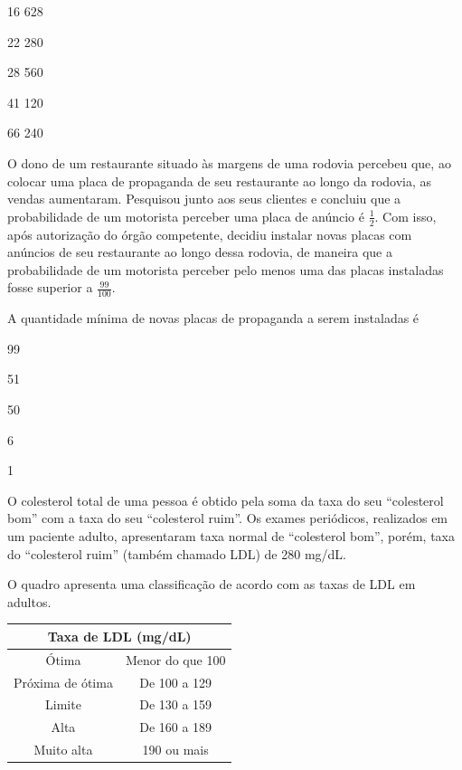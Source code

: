 \begin{alternativas}
\item 16 628
\item 22 280
\item 28 560
\item 41 120
\item 66 240
\end{alternativas}

\questao
O dono de um restaurante situado às margens de
uma rodovia percebeu que, ao colocar uma placa de
propaganda de seu restaurante ao longo da rodovia, as
vendas aumentaram. Pesquisou junto aos seus clientes
e concluiu que a probabilidade de um motorista perceber
uma placa de anúncio é $\displaystyle \frac{1}{2}$.
Com isso, após autorização
do órgão competente, decidiu instalar novas placas com
anúncios de seu restaurante ao longo dessa rodovia, de
maneira que a probabilidade de um motorista perceber
pelo menos uma das placas instaladas fosse superior
a $\displaystyle \frac{99}{100}$.

A quantidade mínima de novas placas de propaganda a
serem instaladas é

\begin{alternativas}
\item 99
\item 51
\item 50
\item 6
\item 1
\end{alternativas}

\questao
O colesterol total de uma pessoa é obtido pela
soma da taxa do seu “colesterol bom” com a taxa do
seu “colesterol ruim”. Os exames periódicos, realizados
em um paciente adulto, apresentaram taxa normal
de “colesterol bom”, porém, taxa do “colesterol ruim”
(também chamado LDL) de 280 mg/dL.

O quadro apresenta uma classificação de acordo com
as taxas de LDL em adultos.

\begin{center}
\begin{tabular}{|c|c|}
\hline
\multicolumn{2}{|c|}{\textbf{Taxa de LDL (mg/dL)}} \\
\hline
Ótima & Menor do que 100 \\
\hline
Próxima de ótima & De 100 a 129 \\
\hline
Limite & De 130 a 159 \\
\hline
Alta & De 160 a 189 \\
\hline
Muito alta & 190 ou mais \\
\hline
\end{tabular}
\end{center}

